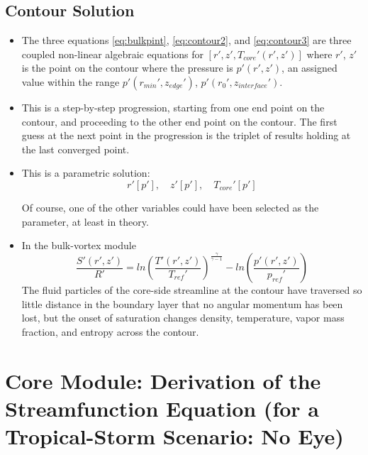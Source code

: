 \documentclass[preprint, prX]{revtex4}
\newcommand{\pfrac}[2]{\left(\frac{#1}{#2}\right)}
\newcommand{\gogmo}{\frac{\gamma}{\gamma-1}}
\newcommand{\rmin}{r_{min}}
\newcommand{\zedge}{z_{edge}}
\newcommand{\zinter}{z_{interface}}
\begin{document}
\subsection{Contour Solution}

\begin{itemize}
\item The three equations \eqref{eq:bulkpint}, \eqref{eq:contour2}, and \eqref{eq:contour3} are three coupled non-linear algebraic equations for $[r',z', T_{core}'(r',z')]$ where $r'$, $z'$ is the point on the contour where the pressure is $p'(r',z')$, an assigned value within the range $p'(\rmin', \zedge')$, $p'(r_0', \zinter')$.

\item This is a step-by-step progression, starting from one end point on the contour, and proceeding  to the other end point on the contour. The first guess at the next point in the progression is the triplet of results holding at the last converged point.

\item This is a parametric solution:
\begin{equation}
	r'[p'], \quad z'[p'], \quad  T_{core}'[p']
\end{equation}

Of course, one of the other variables could have been selected as the parameter, at least in theory.

\item In the bulk-vortex module
\begin{equation}
	\frac{S'(r',z')}{R'} = ln  \pfrac{T'(r',z')}{T_{ref}'} ^\gogmo - ln  \pfrac{p'(r',z')}{p_{ref}'}
\end{equation}
The fluid particles of the core-side streamline at the contour have traversed so little distance in the boundary layer that no angular momentum has been lost, but the onset of saturation changes density, temperature, vapor mass fraction, and entropy across the contour.
\end{itemize}

\section{Core Module: Derivation of the Streamfunction Equation (for a Tropical-Storm Scenario: No Eye)}
\end{document}
